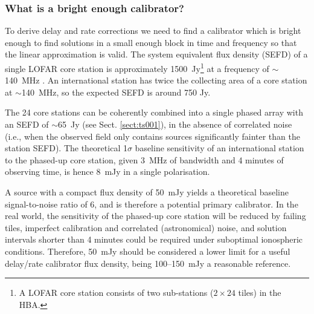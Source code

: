 \documentclass[graybox]{svmult}
\begin{document}
\subsubsection{What is a bright enough calibrator?}
To derive delay and rate corrections we need to find a calibrator which is
bright enough to find solutions in a small enough block in time and frequency
so that the linear approximation is valid. 
The system equivalent flux density (SEFD) of a single LOFAR core station is
approximately 1500~Jy\footnote{A LOFAR core station consists of two
sub-stations ($2\times24$ tiles) in the HBA.} at a frequency of $\sim$140~MHz
\citep{vanhaarlem13}.  An international station has twice the collecting area
of a core station at $\sim$140~MHz, so the expected SEFD is around 750 Jy.  

The 24 core stations can be coherently combined into a single phased array with
an SEFD of $\sim$65~Jy (see Sect. \ref{sect:ts001}), in the absence of correlated noise (i.e., when the
observed field only contains sources significantly fainter than the station
SEFD).  The theoretical 1$\sigma$ baseline sensitivity of an international
station to the phased-up core station, given 3~MHz of bandwidth and 4 minutes
of observing time, is hence 8~mJy in a single polarisation.  

A source with a compact flux density of 50~mJy yields a theoretical baseline
signal-to-noise ratio of 6, and is therefore a potential primary calibrator. In
the real world, the sensitivity of the phased-up core station will be reduced
by failing tiles, imperfect calibration and correlated (astronomical) noise,
and solution intervals shorter than 4 minutes could be required under suboptimal 
ionospheric conditions.  Therefore, 50~mJy should be considered a lower
limit for a useful delay/rate calibrator flux density, being 100--150~mJy a
reasonable reference.
\end{document}
